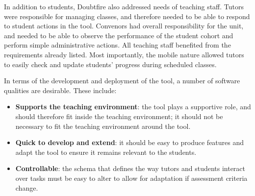 In addition to students, Doubtfire also addressed needs of teaching staff. Tutors were responsible for managing classes, and therefore needed to be able to respond to student actions in the tool. Convenors had overall responsibility for the unit, and needed to be able to observe the performance of the student cohort and perform simple administrative actions. All teaching staff benefited from the requirements already listed. Most importantly, the mobile nature allowed tutors to easily check and update students' progress during scheduled classes.

\medskip

In terms of the development and deployment of the tool, a number of software qualities are desirable. These include:
\begin{itemize}[noitemsep,nolistsep]
  \item \textbf{Supports the teaching environment}: the tool plays a supportive role, and should therefore fit inside the teaching environment; it should not be necessary to fit the teaching environment around the tool.
  \item \textbf{Quick to develop and extend}: it should be easy to produce features and adapt the tool to ensure it remains relevant to the students.
  \item \textbf{Controllable}: the schema that defines the way tutors and students interact over tasks must be easy to alter to allow for adaptation if assessment criteria change.
\end{itemize}


